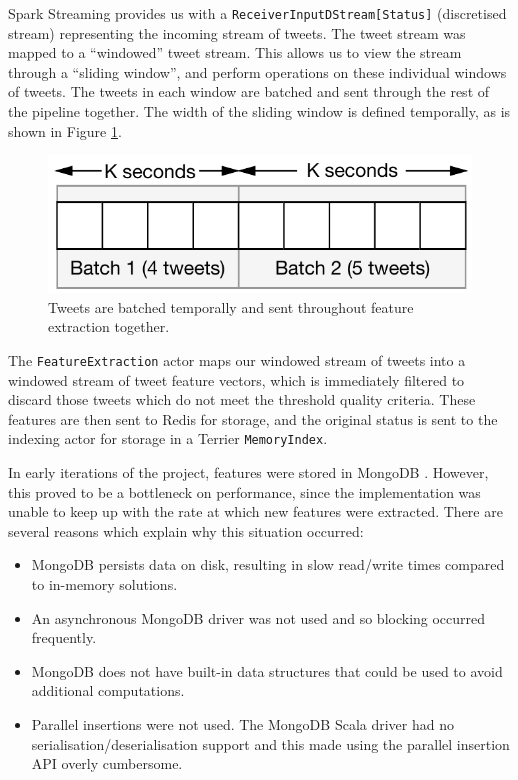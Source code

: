 \documentclass{l4proj}
\newcommand{\code}[1]{\texttt{#1}}
\begin{document}
        Spark Streaming provides us with a \code{ReceiverInputDStream[Status]} (discretised stream) representing the incoming stream of tweets. The tweet stream was mapped to a ``windowed'' tweet stream. This allows us to view the stream through a ``sliding window'', and perform operations on these individual windows of tweets. The tweets in each window are batched and sent through the rest of the pipeline together. The width of the sliding window is defined temporally, as is shown in Figure \ref{slidingwindow}.
        
\begin{figure}
\centering
\includegraphics[scale=0.8]{slidingwindow.pdf}
\caption{Tweets are batched temporally and sent throughout feature extraction together.}
\label{slidingwindow}
\end{figure}

        The \code{FeatureExtraction} actor maps our windowed stream of tweets into a windowed stream of tweet feature vectors, which is immediately filtered to discard those tweets which do not meet the threshold quality criteria. These features are then sent to Redis for storage, and the original status is sent to the indexing actor for storage in a Terrier \code{MemoryIndex}.
        
        In early iterations of the project, features were stored in MongoDB \cite{mongo}. However, this proved to be a bottleneck on performance, since the implementation was unable to keep up with the rate at which new features were extracted. There are several reasons which explain why this situation occurred:
        
        \begin{itemize}
        \item MongoDB persists data on disk, resulting in slow read/write times compared to in-memory solutions.
        \item An asynchronous MongoDB driver was not used and so blocking occurred frequently.
        \item MongoDB does not have built-in data structures that could be used to avoid additional computations.
        \item Parallel insertions were not used. The MongoDB Scala driver had no serialisation/deserialisation support and this made using the parallel insertion API overly cumbersome.
        \end{itemize}
        
\end{document}
